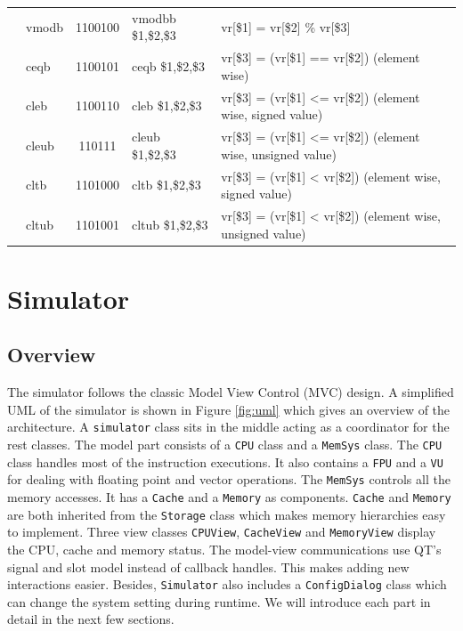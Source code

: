 \documentclass{sig-alternate}
\begin{document}
\begin{table}
\begin{tabular}{|c|l|c|l|p{8cm}|}
 & vmodb & 1100100 & vmodbb \$1,\$2,\$3 & vr[\$1] = vr[\$2] \% vr[\$3] \\ \cline{2-5}
 & ceqb & 1100101 & ceqb \$1,\$2,\$3 & vr[\$3] = (vr[\$1] == vr[\$2]) (element wise)\\ \cline{2-5}  
 & cleb & 1100110 & cleb \$1,\$2,\$3&vr[\$3] = (vr[\$1] <= vr[\$2]) (element wise, signed value)  \\ \cline{2-5}
 & cleub & 110111 & cleub \$1,\$2,\$3 & vr[\$3] = (vr[\$1] <= vr[\$2]) (element wise, unsigned value) \\ \cline{2-5}
 & cltb & 1101000 & cltb \$1,\$2,\$3 & vr[\$3] = (vr[\$1] < vr[\$2]) (element wise, signed value) \\ \cline{2-5}
 & cltub & 1101001 & cltub \$1,\$2,\$3 &vr[\$3] = (vr[\$1] < vr[\$2]) (element wise, unsigned value) \\ \hline
\end{tabular}
\end{table}


\section{Simulator}
\subsection{Overview}
The simulator follows the classic Model View Control (MVC) design. A simplified UML of the simulator is shown in Figure \ref{fig:uml} which gives an overview of the architecture. A \texttt{simulator} class sits in the middle acting as a coordinator for the rest classes. The model part consists of a \texttt{CPU} class and a \texttt{MemSys} class. The \texttt{CPU} class handles most of the instruction executions. It also contains a \texttt{FPU} and a \texttt{VU} for dealing with floating point and vector operations. The \texttt{MemSys} controls all the memory accesses. It has a \texttt{Cache} and a \texttt{Memory} as components. \texttt{Cache} and \texttt{Memory} are both inherited from the \texttt{Storage} class which makes memory hierarchies easy to implement. Three view classes \texttt{CPUView}, \texttt{CacheView} and \texttt{MemoryView} display the CPU, cache and memory status. The model-view communications use QT's signal and slot model instead of callback handles. This makes adding new interactions easier. Besides, \texttt{Simulator} also includes a \texttt{ConfigDialog} class which can change the system setting during runtime. We will introduce each part in detail in the next few sections. 
\end{document}
